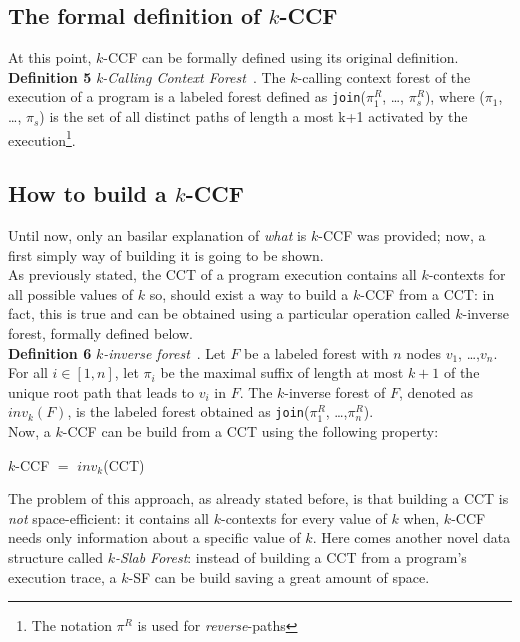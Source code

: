 \documentclass[a4paper,10pt]{report}
\begin{document}
\subsection{The formal definition of $k$-CCF}

At this point, $k$-CCF can be formally defined using its original definition.\\

\textbf{Definition 5} \emph{k-Calling Context Forest}~\cite{kccf}. The $k$-calling context
forest of the execution of a program is a labeled forest defined as 
\texttt{join}($\pi_1^R$, \ldots, $\pi_s^R$), where ($\pi_1$, \ldots, $\pi_s$) is the set of
all distinct paths of length a most k+1 activated by the execution\footnote{The notation $\pi^R$ is used for \emph{reverse}-paths}.

\subsection{How to build a $k$-CCF}

Until now, only an basilar explanation of \emph{what} is $k$-CCF was provided; 
now, a first simply way of building it is going to be shown.\\
As previously stated, the CCT of a program execution contains all $k$-contexts for
all possible values of $k$ so, should exist a way to build a $k$-CCF from a CCT: in fact, this is true and can be obtained using a particular operation called $k$-inverse forest, formally defined below.\\

\textbf{Definition 6} \emph{$k$-inverse forest}~\cite{kccf}. Let $F$ be a labeled forest with $n$ nodes
$v_1$, \ldots ,$v_n$. For all $i \in [1,n]$, let $\pi_i$ be the maximal suffix of length at most $k+1$ of the unique root path that leads to $v_i$ in $F$. The $k$-inverse forest of $F$, denoted as $inv_k(F)$, is the labeled forest obtained as \texttt{join}($\pi_1^R$, \ldots ,$\pi_n^R$).\\[20pt]
Now, a $k$-CCF can be build from a CCT using the following property:
\begin{center}
$k$-CCF $=$ $inv_k$(CCT)
\end{center}

The problem of this approach, as already stated before, is that building a CCT 
is \emph{not} space-efficient: it contains all $k$-contexts for every value of $k$ when,
$k$-CCF needs only information about a specific value of $k$. 
Here comes another novel data structure called \emph{$k$-Slab Forest}: 
instead of building a CCT from a program's execution trace, a $k$-SF can be build saving a great amount of space.\\
\end{document}
